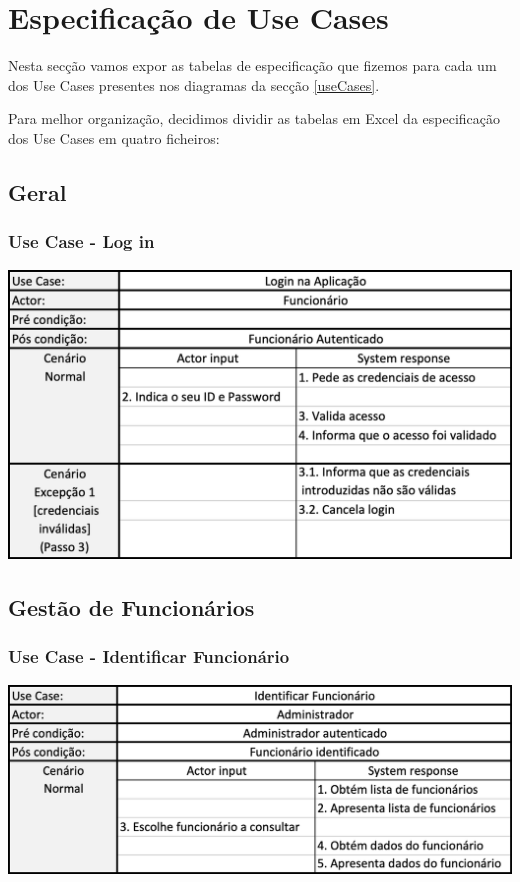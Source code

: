 \section{Especificação de Use Cases}
Nesta secção vamos expor as tabelas de especificação que fizemos para cada um dos Use Cases presentes nos diagramas da secção \ref{useCases}.

Para melhor organização, decidimos dividir as tabelas em Excel da especificação dos Use Cases em quatro ficheiros: 
\subsection{Geral}
\subsubsection{Use Case - Log in}
\begin{center}
 	\includegraphics[width = 5.5in]{D_E_USECASE/uc_login.png}
\end{center}
\newpage
\subsection{Gestão de Funcionários}
\subsubsection{Use Case - Identificar Funcionário}
\begin{center}
 	\includegraphics[width = 5.5in]{D_E_USECASE/uc_identificar_funcionario.png}
\end{center}
